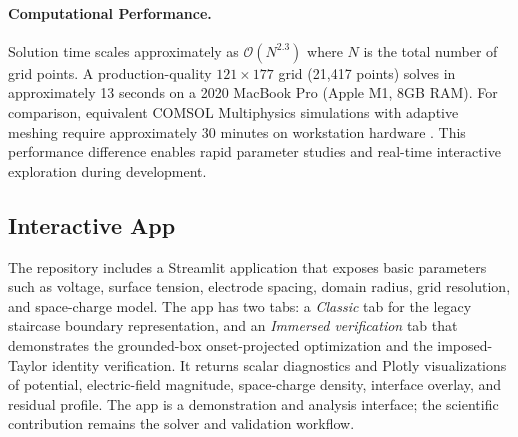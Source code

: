 \paragraph{Computational Performance.} Solution time scales approximately as $\mathcal{O}(N^{2.3})$ where $N$ is the total number of grid points. A production-quality $121\times177$ grid (21,417 points) solves in approximately 13 seconds on a 2020 MacBook Pro (Apple M1, 8GB RAM). For comparison, equivalent COMSOL Multiphysics simulations with adaptive meshing require approximately 30 minutes on workstation hardware \cite{fernandez2006electrospray}. This performance difference enables rapid parameter studies and real-time interactive exploration during development.

\subsection{Interactive App}

The repository includes a Streamlit application that exposes basic parameters such as voltage, surface tension, electrode spacing, domain radius, grid resolution, and space-charge model. The app has two tabs: a \emph{Classic} tab for the legacy staircase boundary representation, and an \emph{Immersed verification} tab that demonstrates the grounded-box onset-projected optimization and the imposed-Taylor identity verification. It returns scalar diagnostics and Plotly visualizations of potential, electric-field magnitude, space-charge density, interface overlay, and residual profile. The app is a demonstration and analysis interface; the scientific contribution remains the solver and validation workflow.
